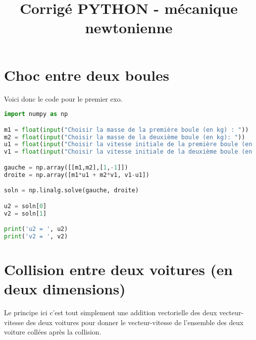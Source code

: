 \documentclass[11pt,a4paper]{article}
\title{Corrigé PYTHON - mécanique newtonienne }
\date{}
\author{}
\newcounter{exo}
\begin{document}
\maketitle

\section{Choc entre deux boules}
Voici donc le code pour le premier exo. 

\begin{lstlisting}[language=Python]
import numpy as np

m1 = float(input("Choisir la masse de la première boule (en kg) : "))
m2 = float(input("Choisir la masse de la deuxième boule (en kg): "))
u1 = float(input("Choisir la vitesse initiale de la première boule (en m/s) : "))
v1 = float(input("Choisir la vitesse initiale de la deuxième boule (en m/s) : "))

gauche = np.array([[m1,m2],[1,-1]])
droite = np.array([m1*u1 + m2*v1, v1-u1])

soln = np.linalg.solve(gauche, droite)

u2 = soln[0]
v2 = soln[1]

print('u2 = ', u2)
print('v2 = ', v2)

\end{lstlisting}

\section{Collision entre deux voitures (en deux dimensions)}

Le principe ici c'est tout simplement une addition vectorielle des deux vecteur-vitesse des deux voitures pour donner le vecteur-vitesse de l'ensemble des deux voiture collées après la collision.
\end{document}
